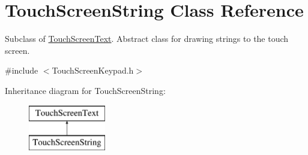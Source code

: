 \hypertarget{class_touch_screen_string}{\section{Touch\+Screen\+String Class Reference}
\label{class_touch_screen_string}
}


Subclass of \hyperlink{class_touch_screen_text}{Touch\+Screen\+Text}. Abstract class for drawing strings to the touch screen.  




{\ttfamily \#include $<$Touch\+Screen\+Keypad.\+h$>$}

Inheritance diagram for Touch\+Screen\+String\+:\begin{figure}[H]
\begin{center}
\leavevmode
\includegraphics[height=2.000000cm]{class_touch_screen_string}
\end{center}
\end{figure}
